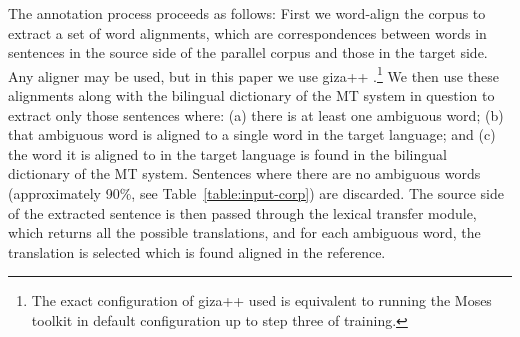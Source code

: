 \documentclass[11pt]{article}
\begin{document}
The annotation process proceeds as follows: First we word-align the
corpus to extract a set of word alignments, which are correspondences
between words in sentences in the source side of the parallel corpus
and those in the target side. Any aligner may be used, but in this
paper we use {\sc giza++} \citep{och03a}.\footnote{The exact
  configuration of {\sc giza++} used is equivalent to running the {\sc
    Moses} toolkit \citep{koehn07} in default configuration up to step
  three of training.}  We then use
these alignments along with the bilingual dictionary of the MT system
in question to extract only those sentences where: (a) there is at least
one ambiguous word; (b) that ambiguous word is aligned to a single word in
the target language; and (c) the word it is aligned to in the target
language is found in the bilingual dictionary of the MT
system. Sentences where there are no ambiguous words (approximately
90\%, see Table~\ref{table:input-corp}) are discarded. The source side
of the extracted sentence is then passed through the lexical transfer
module, which returns all the possible translations, and for each
ambiguous word, the translation is selected which is found aligned in
the reference.

\end{document}
